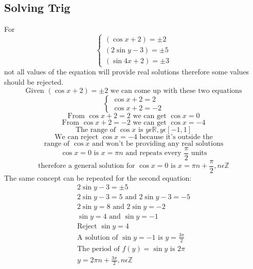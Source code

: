 \documentclass[a4paper,12pt]{article}
\begin{document}
\subsection*{Solving Trig}
For \newline
$$
\begin{cases}
    (\cos x+2) = \pm 2 \\
    (2\sin y-3) = \pm 5 \\
    (\sin 4x+2) = \pm 3 
\end{cases}
$$
\newline
not all values of the equation will provide real solutions therefore some values should be rejected. \newline
$$\text{Given } (\cos x+2) = \pm 2 \text{ we can come up with these two equations}$$
$$
\begin{cases}
    \cos x+2 = 2 \\
    \cos x+2 = -2
\end{cases}
$$
$$\text{From } \cos x+2 = 2 \text{ we can get } \cos x=0$$ \newline
$$\text{From } \cos x+2 = -2 \text{ we can get } \cos x=-4$$ \newline
$$\text{The range of } \cos x \text{ is } y\epsilon\mathbb{R}, y\epsilon [-1, 1]$$ \newline
$$\text{We can reject } \cos x=-4 \text{ because it's outside the}$$
$$\text{range of } \cos x\text{ and won't be providing any real solutions}$$\newline
$$\cos x=0 \text{ is } x = \pi n \text{ and repeats every } \frac{\pi}{2}\text{ units}$$
$$\text{therefore a general solution for }\cos x=0 \text{ is } x = \pi n + \frac{\pi}{2}, n\epsilon\mathbb{Z}$$
The same concept can be repeated for the second equation:
\begin{equation}
    \begin{split}
        2\sin y-3 = \pm 5 \\
        2\sin y-3 = 5 \text{ and } 2\sin y-3 =-5 \\
        2\sin y= 8 \text{ and } 2\sin y=-2 \\
        \sin y= 4 \text{ and } \sin y=-1 \\
        \text{Reject } \sin y=4 \\
        \text{A solution of } \sin y=-1 \text{ is } y= \frac{3\pi}{2}\\
        \text{The period of } f(y)=\sin y \text{ is } 2\pi\\
        y = 2\pi n + \frac{3\pi}{2}, n\epsilon\mathbb{Z}
    \end{split}
\end{equation}
\end{document}
